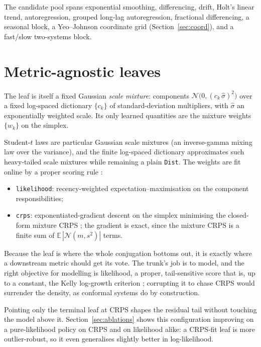 \documentclass[article]{jss}
\providecommand{\code}[1]{\texttt{#1}}
\begin{document}
The candidate pool spans exponential smoothing, differencing, drift, Holt's
linear trend, autoregression, grouped long-lag autoregression, fractional
differencing, a seasonal block, a Yeo--Johnson coordinate grid
(Section~\ref{sec:coord}), and a fast/slow two-systems block.

\section{Metric-agnostic leaves} \label{sec:leaf}

The leaf is itself a fixed Gaussian \emph{scale mixture}: components
$\mathcal N\!\big(0, (c_k\,\hat\sigma)^2\big)$ over a fixed log-spaced
dictionary $\{c_k\}$ of standard-deviation multipliers, with $\hat\sigma$ an
exponentially weighted scale. Its only learned quantities are the mixture
weights $\{w_k\}$ on the simplex.

Student-$t$ laws are particular Gaussian
scale mixtures (an inverse-gamma mixing law over the variance), and the finite
log-spaced dictionary approximates such heavy-tailed scale mixtures while
remaining a plain \code{Dist}. The weights are fit online by
a proper scoring rule \citep{gneiting2007strictly}:
\begin{itemize}
\item \code{likelihood}: recency-weighted expectation--maximisation on the
  component responsibilities;
\item \code{crps}: exponentiated-gradient descent on the simplex minimising the
  closed-form mixture CRPS \citep{matheson1976scoring}; the gradient is exact,
  since the mixture CRPS is a finite sum of $\mathbb E\,|\mathcal N(m,s^2)|$ terms.
\end{itemize}

Because the leaf is where the whole conjugation bottoms out, it is exactly where a
downstream metric should get its vote. The trunk's job is to model, and the right
objective for modelling is likelihood, a proper, tail-sensitive score that is,
up to a constant, the Kelly log-growth criterion \citep{kelly1956new}; corrupting
it to chase CRPS would surrender the density, as conformal systems do by
construction.

Pointing only the terminal leaf at CRPS shapes the residual tail without touching
the model above it. Section~\ref{sec:ablations} shows this configuration
improving on a pure-likelihood policy on CRPS and on likelihood alike: a CRPS-fit
leaf is more outlier-robust, so it even generalises slightly better in
log-likelihood.
\end{document}
